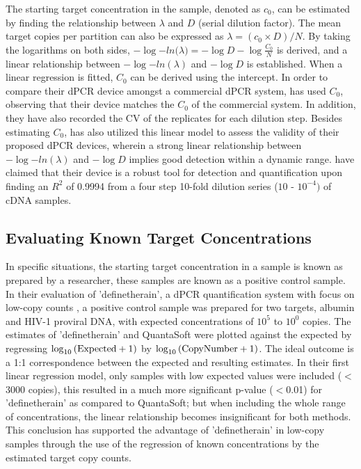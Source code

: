 The starting target concentration in the sample, denoted as \(c_0\), can be estimated by finding the relationship between \(\lambda\) and \(D\) (serial dilution factor). The mean target copies per partition can also be expressed as \(\lambda = (c_0 \times D)/N \). By taking the logarithms on both sides, \(-\log{-ln(\lambda}) = -\log{D} - \log{\frac{C_0}{N}}\) is derived, and a linear relationship between  \(-\log{-ln(\lambda)}\) and \(-\log{D}\) is established. When a linear regression is fitted, \(C_0\) can be derived using the intercept. In order to compare their dPCR device amongst a commercial dPCR system,  has used \(C_0\), observing that their device matches the \(C_0\) of the commercial system. In addition, they have also recorded the CV of the replicates for each dilution step. Besides estimating \(C_0\),  has also utilized this linear model to assess the validity of their proposed dPCR devices, wherein a strong linear relationship between \(-\log{-ln(\lambda)}\) and \(-\log{D}\) implies good detection within a dynamic range.  have claimed that their device is a robust tool for detection and quantification upon finding an \(R^2\) of 0.9994 from a four step 10-fold dilution series (\(10\) - \(10^{-4})\) of cDNA samples.


\subsection{Evaluating Known Target Concentrations}
\label{sec:ch2_perfeval_essentialMetrics}
In specific situations, the starting target concentration in a sample is known as prepared by a researcher, these samples are known as a positive control sample. In their evaluation of 'definetherain', a dPCR quantification system with focus on low-copy counts \cite{Jones2014}, a positive control sample was prepared for two targets, albumin and HIV-1 proviral DNA, with expected concentrations of \(10^5\) to \(10^0\) copies. The estimates of 'definetherain' and QuantaSoft were plotted against the expected by regressing \(\log_{10}{(\textup{Expected} + 1)}\) by \(\log_{10}{(\textup{CopyNumber} + 1)}\). The ideal outcome is a 1:1 correspondence between the expected and resulting estimates. In their first linear regression model, only samples with low expected values were included ($<$3000 copies), this resulted in a much more significant p-value ($<$0.01) for 'definetherain' as compared to QuantaSoft; but when including the whole range of concentrations, the linear relationship becomes insignificant for both methods. This conclusion has supported the advantage of 'definetherain' in low-copy samples through the use of the regression of known concentrations by the estimated target copy counts.

